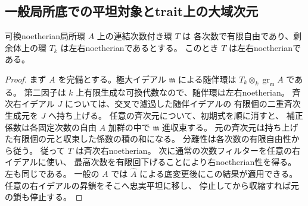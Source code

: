 \subsection{一般局所底での平坦対象とtrait上の大域次元}
\begin{proposition}\label{prop:h3-noetherian-local-lift}
可換noetherian局所環 $A$ 上の連結次数付き環 $T$ は
各次数で有限自由であり、剰余体上の環 $T_k$ は左右noetherianであるとする。
このとき $T$ は左右noetherianである。
\end{proposition}
\begin{proof}
まず $A$ を完備とする。極大イデアル $\mathfrak m$ による随伴環は
$T_k\otimes_k\operatorname{gr}_{\mathfrak m}A$ である。
第二因子は $k$ 上有限生成な可換代数なので、随伴環は左右noetherian。
斉次右イデアル $J$ については、交叉で濾過した随伴イデアルの
有限個の二重斉次生成元を $J$ へ持ち上げる。
任意の斉次元について、初期式を順に消すと、
補正係数は各固定次数の自由 $A$ 加群の中で $\mathfrak m$ 進収束する。
元の斉次元は持ち上げた有限個の元と収束した係数の積の和になる。
分離性は各次数の有限自由性から従う。
従って $T$ は斉次右noetherian。
次に通常の次数フィルターを任意の右イデアルに使い、
最高次数を有限回下げることにより右noetherian性を得る。
左も同じである。
一般の $A$ では $\widehat A$ による底変更後にこの結果が適用できる。
任意の右イデアルの昇鎖をそこへ忠実平坦に移し、
停止してから収縮すれば元の鎖も停止する。
\end{proof}

